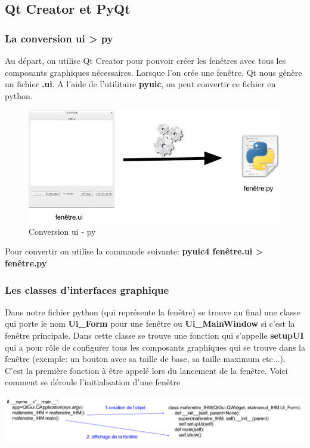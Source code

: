 \documentclass[a4paper,11pt]{article}
\begin{document}
\subsection{Qt Creator et PyQt}
\subsubsection{La conversion ui > py}
Au départ, on utilise Qt Creator pour pouvoir créer les fenêtres avec tous les composants graphiques nécessaires. Lorsque l'on crée une fenêtre, Qt nous génère un fichier \textbf{.ui}. A l'aide de l'utilitaire \textbf{pyuic}, on peut convertir ce fichier en python.
\begin{figure}[hbtp]
\centering
\includegraphics[scale=0.3]{conversion_ui_py.jpg}
\caption{Conversion ui - py}
\end{figure}
Pour convertir on utilise la commande suivante: \textbf{pyuic4 fenêtre.ui > fenêtre.py}\linebreak
\\
\subsubsection{Les classes d'interfaces graphique}
Dans notre fichier python (qui représente la fenêtre) se trouve au final une classe qui porte le nom \textbf{Ui\_Form} pour une fenêtre ou \textbf{Ui\_MainWindow} si c'est la fenêtre principale. Dans cette classe se trouve une fonction qui s'appelle \textbf{setupUI} qui a pour rôle de configurer tous les composants graphiques qui se trouve dans la fenêtre (exemple: un bouton avec sa taille de base, sa taille maximum etc...). C'est la première fonction à être appelé lors du lancement de la fenêtre.
\linebreak
Voici comment se déroule l'initialisation d'une fenêtre
\begin{center}
\includegraphics[scale=0.45]{initialisation_fenetre.jpg} 
\end{center}
\end{document}
